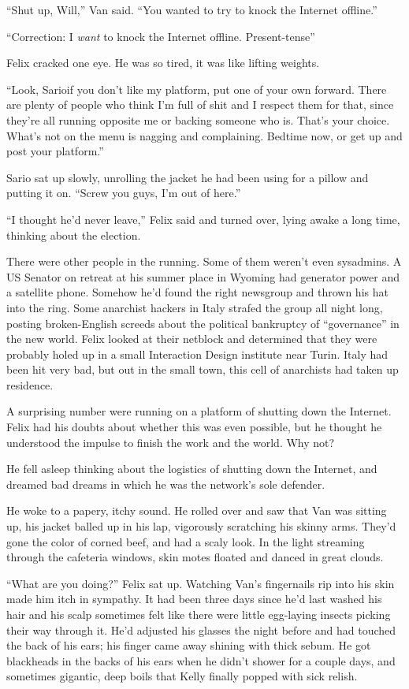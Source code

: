 “Shut up, Will,” Van said. “You wanted to try to knock the Internet
offline.”

“Correction: I \emph{want} to knock the Internet offline.
Present-tense”

Felix cracked one eye. He was so tired, it was like lifting
weights.

“Look, Sario\dash{}if you don’t like my platform, put one of your own
forward. There are plenty of people who think I’m full of shit and
I respect them for that, since they’re all running opposite me or
backing someone who is. That’s your choice. What’s not on the menu
is nagging and complaining. Bedtime now, or get up and post your
platform.”

Sario sat up slowly, unrolling the jacket he had been using for a
pillow and putting it on. “Screw you guys, I’m out of here.”

“I thought he’d never leave,” Felix said and turned over, lying
awake a long time, thinking about the election.

There were other people in the running. Some of them weren’t even
sysadmins. A US Senator on retreat at his summer place in Wyoming
had generator power and a satellite phone. Somehow he’d found the
right newsgroup and thrown his hat into the ring. Some anarchist
hackers in Italy strafed the group all night long, posting
broken-English screeds about the political bankruptcy of
“governance” in the new world. Felix looked at their netblock and
determined that they were probably holed up in a small Interaction
Design institute near Turin. Italy had been hit very bad, but out
in the small town, this cell of anarchists had taken up residence.

A surprising number were running on a platform of shutting down the
Internet. Felix had his doubts about whether this was even
possible, but he thought he understood the impulse to finish the
work and the world. Why not?

He fell asleep thinking about the logistics of shutting down the
Internet, and dreamed bad dreams in which he was the network’s sole
defender.

He woke to a papery, itchy sound. He rolled over and saw that Van
was sitting up, his jacket balled up in his lap, vigorously
scratching his skinny arms. They’d gone the color of corned beef,
and had a scaly look. In the light streaming through the cafeteria
windows, skin motes floated and danced in great clouds.

“What are you doing?” Felix sat up. Watching Van’s fingernails rip
into his skin made him itch in sympathy. It had been three days
since he’d last washed his hair and his scalp sometimes felt like
there were little egg-laying insects picking their way through it.
He’d adjusted his glasses the night before and had touched the back
of his ears; his finger came away shining with thick sebum. He got
blackheads in the backs of his ears when he didn’t shower for a
couple days, and sometimes gigantic, deep boils that Kelly finally
popped with sick relish.

